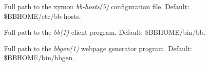  \begin{description}
\item[] Full path to the xymon \emph{bb-hosts(5)}
 configuration file. Default: \$BBHOME/etc/bb-hosts. 

 

\item[] Full path to the \emph{bb(1)}
 client program. Default: \$BBHOME/bin/bb. 

 

\item[] Full path to the \emph{bbgen(1)}
 webpage generator program. Default: \$BBHOME/bin/bbgen. 

 


 


\end{description}

